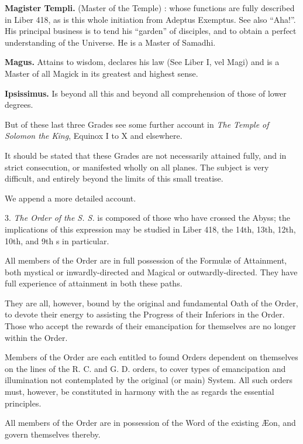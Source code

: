 \textbf{Magister Templi.} \textemdash{} (Master of the Temple) : whose functions are fully described in Liber 418, as is this whole initiation from Adeptus Exemptus. See also \enquote{Aha!}. His principal business is to tend his \enquote{garden} of disciples, and to obtain a perfect understanding of the Universe. He is a Master of Samadhi.

\textbf{Magus.} \textemdash{} Attains to wisdom, declares his law (See Liber I, vel Magi) and is a Master of all Magick in its greatest and
highest sense.

\textbf{Ipsissimus.} \textemdash{} Is beyond all this and beyond all comprehension of those of lower degrees.

But of these last three Grades see some further account in \textit{The Temple of Solomon the King}, Equinox I to X and elsewhere.

It should be stated that these Grades are not necessarily attained fully, and in strict consecution, or manifested wholly on all planes. The subject is very difficult, and entirely beyond the limits of this small treatise.

We append a more detailed account.

\vspace{\baselineskip}

3. \textit{The Order of the S. S.} is composed of those who have crossed the Abyss; the implications of this expression may be studied in Liber 418, the 14th, 13th, 12th, 10th, and 9th \AEthyr{}s in particular.

All members of the Order are in full possession of the Formul\ae{} of Attainment, both mystical or inwardly-directed and Magical or outwardly-directed. They have full experience of attainment in both these paths.

They are all, however, bound by the original and fundamental Oath of the Order, to devote their energy to assisting the Progress of their Inferiors in the Order. Those who accept the rewards of their emancipation for themselves are no longer within the Order.

Members of the Order are each entitled to found Orders dependent on themselves on the lines of the R. C. and G. D. orders, to cover types of emancipation and illumination not contemplated by the original (or main) System. All such orders must, however, be constituted in harmony with the \Argentium{} as regards the essential principles.

All members of the Order are in possession of the Word of the existing \AE{}on, and govern themselves thereby.

